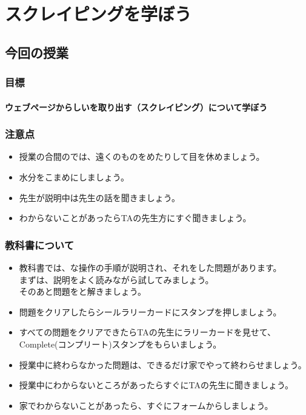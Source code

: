 \documentclass[text08.tex]{subfiles}
\begin{document}
\chapter{スクレイピングを学ぼう}
\section{今回の授業}

\subsection*{目標}
\subsubsection*{ウェブページからしいを取り出す（スクレイピング）について学ぼう}

\subsection*{注意点}
\begin{itemize}
	\item 授業の合間のでは、遠くのものをめたりして目を休めましょう。
	\item 水分をこまめにしましょう。
	\item 先生が説明中は先生の話を聞きましょう。
	\item わからないことがあったらTAの先生方にすぐ聞きましょう。
\end{itemize}

\subsection*{教科書について}
\begin{itemize}

	\item 教科書では、な操作の手順が説明され、それをした問題があります。\\
		  まずは、説明をよく読みながら試してみましょう。\\
		  そのあと問題をと解きましょう。
	\item 問題をクリアしたらシールラリーカードにスタンプを押しましょう。

	\item すべての問題をクリアできたらTAの先生にラリーカードを見せて、\\
	      Complete(コンプリート)スタンプをもらいましょう。
	\item 授業中に終わらなかった問題は、できるだけ家でやって終わらせましょう。
	\item 授業中にわからないところがあったらすぐにTAの先生に聞きましょう。

	\item 家でわからないことがあったら、すぐにフォームからしましょう。
\end{itemize}
\end{document}
